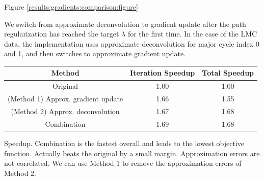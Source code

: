 Figure \ref{results:gradients:comparison:figure}

We switch from approximate deconvolution to gradient update after the path regularization has reached the target $\lambda$ for the first time. In the case of the LMC data, the implementation uses approximate deconvolution for major cycle index 0 and 1, and then switches to approximate gradient update.


\begin{center}
	\begin{tabular}{ c||c|c } 
		\hline
		Method & Iteration Speedup & Total Speedup \\ \hline \hline
		Original & 1.00 & 1.00 \\ 
		(Method 1) Approx. gradient update & 1.66 & 1.55 \\ 
		(Method 2) Approx. deconvolution & 1.67 & 1.68 \\ \hline
		Combination & 1.69 & 1.68 \\ 
		\hline
	\end{tabular}
	\label{results:gradients:comparison:speedup}
\end{center}
Speedup. Combination is the fastest overall and leads to the lowest objective function. Actually beats the original by a small margin.
Approximation errors are not correlated. We can use Method 1 to remove the approximation errors of Method 2.


